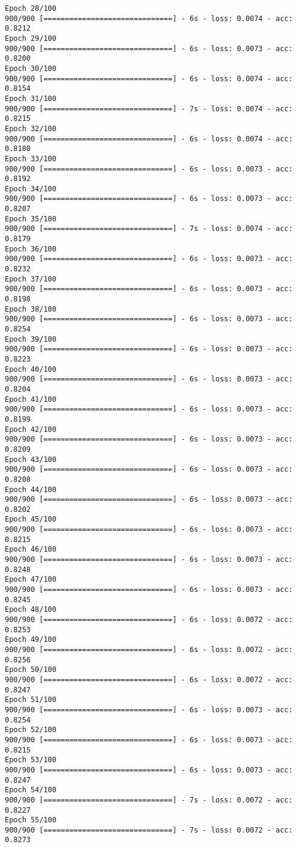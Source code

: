 \documentclass{article}
\begin{document}
\begin{Verbatim}[commandchars=\\\{\}]
Epoch 28/100
900/900 [==============================] - 6s - loss: 0.0074 - acc: 0.8212     
Epoch 29/100
900/900 [==============================] - 6s - loss: 0.0073 - acc: 0.8200     
Epoch 30/100
900/900 [==============================] - 6s - loss: 0.0074 - acc: 0.8154     
Epoch 31/100
900/900 [==============================] - 7s - loss: 0.0074 - acc: 0.8215     
Epoch 32/100
900/900 [==============================] - 6s - loss: 0.0074 - acc: 0.8180     
Epoch 33/100
900/900 [==============================] - 6s - loss: 0.0073 - acc: 0.8192     
Epoch 34/100
900/900 [==============================] - 6s - loss: 0.0073 - acc: 0.8207     
Epoch 35/100
900/900 [==============================] - 7s - loss: 0.0074 - acc: 0.8179     
Epoch 36/100
900/900 [==============================] - 6s - loss: 0.0073 - acc: 0.8232     
Epoch 37/100
900/900 [==============================] - 6s - loss: 0.0073 - acc: 0.8198     
Epoch 38/100
900/900 [==============================] - 6s - loss: 0.0073 - acc: 0.8254     
Epoch 39/100
900/900 [==============================] - 6s - loss: 0.0073 - acc: 0.8223     
Epoch 40/100
900/900 [==============================] - 6s - loss: 0.0073 - acc: 0.8204     
Epoch 41/100
900/900 [==============================] - 6s - loss: 0.0073 - acc: 0.8199     
Epoch 42/100
900/900 [==============================] - 6s - loss: 0.0073 - acc: 0.8209     
Epoch 43/100
900/900 [==============================] - 6s - loss: 0.0073 - acc: 0.8208     
Epoch 44/100
900/900 [==============================] - 6s - loss: 0.0073 - acc: 0.8202     
Epoch 45/100
900/900 [==============================] - 6s - loss: 0.0073 - acc: 0.8215     
Epoch 46/100
900/900 [==============================] - 6s - loss: 0.0073 - acc: 0.8248     
Epoch 47/100
900/900 [==============================] - 6s - loss: 0.0073 - acc: 0.8245     
Epoch 48/100
900/900 [==============================] - 6s - loss: 0.0072 - acc: 0.8253     
Epoch 49/100
900/900 [==============================] - 6s - loss: 0.0072 - acc: 0.8256     
Epoch 50/100
900/900 [==============================] - 6s - loss: 0.0072 - acc: 0.8247     
Epoch 51/100
900/900 [==============================] - 6s - loss: 0.0073 - acc: 0.8254     
Epoch 52/100
900/900 [==============================] - 6s - loss: 0.0073 - acc: 0.8215     
Epoch 53/100
900/900 [==============================] - 6s - loss: 0.0073 - acc: 0.8247     
Epoch 54/100
900/900 [==============================] - 7s - loss: 0.0072 - acc: 0.8227     
Epoch 55/100
900/900 [==============================] - 7s - loss: 0.0072 - acc: 0.8273     

\end{Verbatim}
\end{document}
